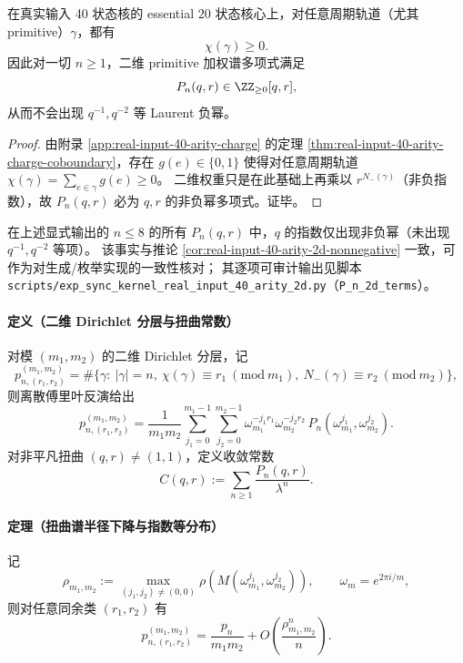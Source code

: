 \begin{corollary}\label{cor:real-input-40-arity-2d-nonnegative}
在真实输入 40 状态核的 essential $20$ 状态核心上，对任意周期轨道（尤其 primitive）\(\gamma\)，都有
\[
\chi(\gamma)\ge 0.
\]
因此对一切 \(n\ge 1\)，二维 primitive 加权谱多项式满足
\[
P_n(q,r)\in\ZZ_{\ge 0}[q,r],
\]
从而不会出现 \(q^{-1},q^{-2}\) 等 Laurent 负幂。
\end{corollary}

\begin{proof}
由附录 \ref{app:real-input-40-arity-charge} 的定理 \ref{thm:real-input-40-arity-charge-coboundary}，存在 \(g(e)\in\{0,1\}\) 使得对任意周期轨道
\(\chi(\gamma)=\sum_{e\in\gamma}g(e)\ge 0\)。
二维权重只是在此基础上再乘以 \(r^{N_-(\gamma)}\)（非负指数），故 \(P_n(q,r)\) 必为 \(q,r\) 的非负幂多项式。证毕。
\end{proof}

\begin{remark}\label{rem:real-input-40-arity-2d-nonneg-evidence}
在上述显式输出的 \(n\le 8\) 的所有 \(P_n(q,r)\) 中，\(q\) 的指数仅出现非负幂（未出现 \(q^{-1},q^{-2}\) 等项）。
该事实与推论 \ref{cor:real-input-40-arity-2d-nonnegative} 一致，可作为对生成/枚举实现的一致性核对；
其逐项可审计输出见脚本 \texttt{scripts/exp\_sync\_kernel\_real\_input\_40\_arity\_2d.py}（\texttt{P\_n\_2d\_terms}）。
\end{remark}
\paragraph{定义（二维 Dirichlet 分层与扭曲常数）}
对模 $(m_1,m_2)$ 的二维 Dirichlet 分层，记
\[
p_{n,(r_1,r_2)}^{(m_1,m_2)}
=\#\{\gamma:\ |\gamma|=n,\ \chi(\gamma)\equiv r_1\ (\mathrm{mod}\ m_1),\ N_-(\gamma)\equiv r_2\ (\mathrm{mod}\ m_2)\},
\]
则离散傅里叶反演给出
\[
p_{n,(r_1,r_2)}^{(m_1,m_2)}
=\frac{1}{m_1m_2}\sum_{j_1=0}^{m_1-1}\sum_{j_2=0}^{m_2-1}
\omega_{m_1}^{-j_1r_1}\omega_{m_2}^{-j_2r_2}\,P_n(\omega_{m_1}^{j_1},\omega_{m_2}^{j_2}).
\]
对非平凡扭曲 $(q,r)\neq(1,1)$，定义收敛常数
\[
C(q,r):=\sum_{n\ge 1}\frac{P_n(q,r)}{\lambda^n}.
\]
\paragraph{定理（扭曲谱半径下降与指数等分布）}
记
\[
\rho_{m_1,m_2}:=\max_{(j_1,j_2)\neq(0,0)}\rho\!\left(M(\omega_{m_1}^{j_1},\omega_{m_2}^{j_2})\right),
\qquad \omega_m=e^{2\pi i/m},
\]
则对任意同余类 $(r_1,r_2)$ 有
\[
p_{n,(r_1,r_2)}^{(m_1,m_2)}=\frac{p_n}{m_1m_2}+O\!\left(\frac{\rho_{m_1,m_2}^n}{n}\right).
\]

